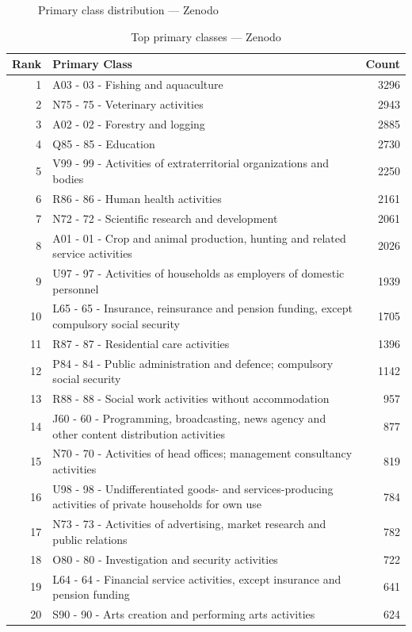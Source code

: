 \begin{figure}[H]
    \centering
    
    \caption{Primary class distribution --- Zenodo}
\end{figure}

\begin{table}[H]
    \centering
    \begin{tabular}{r p{10cm} r}
    \hline
    \textbf{Rank} & \textbf{Primary Class} & \textbf{Count} \\
    \hline
    1 & A03 - 03 - Fishing and aquaculture & 3296 \\
    2 & N75 - 75 - Veterinary activities & 2943 \\
    3 & A02 - 02 - Forestry and logging & 2885 \\
    4 & Q85 - 85 - Education & 2730 \\
    5 & V99 - 99 - Activities of extraterritorial organizations and bodies & 2250 \\
    6 & R86 - 86 - Human health activities & 2161 \\
    7 & N72 - 72 - Scientific research and development & 2061 \\
    8 & A01 - 01 - Crop and animal production, hunting and related service activities & 2026 \\
    9 & U97 - 97 - Activities of households as employers of domestic personnel & 1939 \\
    10 & L65 - 65 - Insurance, reinsurance and pension funding, except compulsory social security & 1705 \\
    11 & R87 - 87 - Residential care activities & 1396 \\
    12 & P84 - 84 - Public administration and defence; compulsory social security & 1142 \\
    13 & R88 - 88 - Social work activities without accommodation & 957 \\
    14 & J60 - 60 - Programming, broadcasting, news agency and other content distribution activities & 877 \\
    15 & N70 - 70 - Activities of head offices; management consultancy activities & 819 \\
    16 & U98 - 98 - Undifferentiated goods- and services-producing activities of private households for own use & 784 \\
    17 & N73 - 73 - Activities of advertising, market research and public relations & 782 \\
    18 & O80 - 80 - Investigation and security activities & 722 \\
    19 & L64 - 64 - Financial service activities, except insurance and pension funding & 641 \\
    20 & S90 - 90 - Arts creation and performing arts activities & 624 \\
    \hline
    \end{tabular}
    \caption{Top primary classes --- Zenodo}
\end{table}

